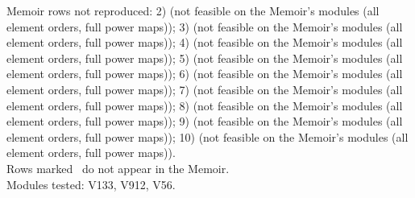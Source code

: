 \noindent Memoir rows not reproduced: 2) (not feasible on the Memoir's modules (all element orders, full power maps)); 3) (not feasible on the Memoir's modules (all element orders, full power maps)); 4) (not feasible on the Memoir's modules (all element orders, full power maps)); 5) (not feasible on the Memoir's modules (all element orders, full power maps)); 6) (not feasible on the Memoir's modules (all element orders, full power maps)); 7) (not feasible on the Memoir's modules (all element orders, full power maps)); 8) (not feasible on the Memoir's modules (all element orders, full power maps)); 9) (not feasible on the Memoir's modules (all element orders, full power maps)); 10) (not feasible on the Memoir's modules (all element orders, full power maps)).\\
Rows marked \newrow\ do not appear in the Memoir.\\
Modules tested: V133, V912, V56.\\

